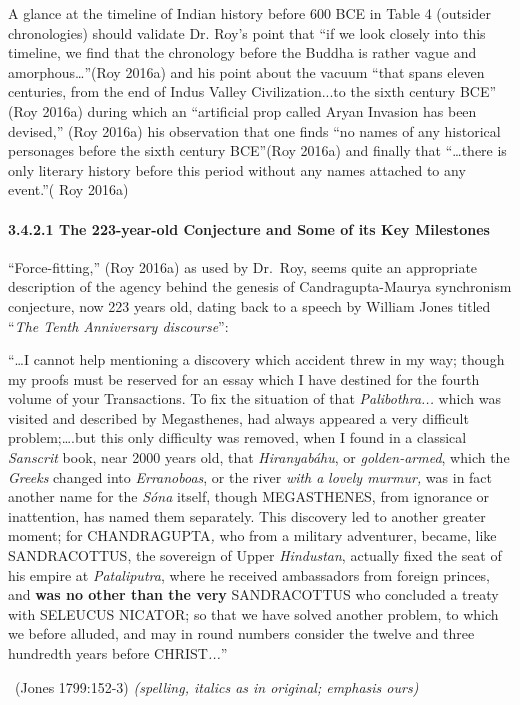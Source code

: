 A glance at the timeline of Indian history before 600 BCE in Table 4 (outsider chronologies) should validate Dr. Roy’s point that “if we look closely into this timeline, we find that the chronology before the Buddha is rather vague and amorphous…”(Roy 2016a) and his point about the vacuum “that spans eleven centuries, from the end of Indus Valley Civilization...to the sixth century BCE” (Roy 2016a) during which an “artificial prop called Aryan Invasion has been devised,” (Roy 2016a) his observation that one finds “no names of any historical personages before the sixth century BCE”(Roy 2016a) and finally that “…there is only literary history before this period without any names attached to any event.”( Roy 2016a)


\paragraph*{3.4.2.1 The 223-year-old Conjecture and Some of its Key Milestones}

“Force-fitting,” (Roy 2016a) as used by Dr.~Roy, seems quite an appropriate description of the agency behind the genesis of Candragupta-Maurya synchronism conjecture, now 223 years old, dating back to a speech by William Jones titled “\textit{The Tenth Anniversary discourse}”:

\begin{myquote}
“…I cannot help mentioning a discovery which accident threw in my way; though my proofs must be reserved for an essay which I have destined for the fourth volume of your Transactions. To fix the situation of that \textit{Palibothra...} which was visited and described by Megasthenes, had always appeared a very difficult problem;….but this only difficulty was removed, when I found in a classical\textit{ Sanscrit} book, near 2000 years old, that \textit{Hiranyabáhu}, or \textit{golden-armed}, which the \textit{Greeks} changed into \textit{Erranoboas}, or the river \textit{with a} \textit{lovely murmur,} was in fact another name for the \textit{Sóna} itself, though MEGASTHENES, from ignorance or inattention, has named them separately. This discovery led to another greater moment; for CHANDRAGUPTA\textit{,} who from a military adventurer, became, like SANDRACOTTUS, the sovereign of Upper \textit{Hindustan}, actually fixed the seat of his empire at \textit{Pataliputra}, where he received ambassadors from foreign princes, and \textbf{was no other than the very} SANDRACOTTUS who concluded a treaty with SELEUCUS NICATOR; so that we have solved another problem, to which we before alluded, and may in round numbers consider the twelve and three hundredth years before CHRIST\textit{...}” 

~\hfill (Jones 1799:152-3) \textit{(spelling, italics as in original; emphasis ours)}
\end{myquote}


